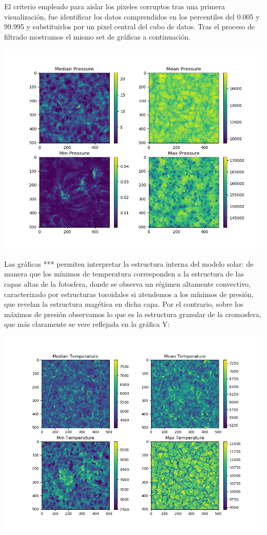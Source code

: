 \documentclass[8pt]{article}
\begin{document}
		
		El criterio empleado para aislar los pixeles corruptos tras una primera visualización, fue identificar los datos comprendidos en los percentiles del 0.005 y 99.995 y substituirlos por un pixel central del cubo de datos. Tras el proceso de filtrado 	mostramos el mismo set de gráficas a continuación.	


		\center \includegraphics[scale=0.5]{Pressure-Z-OK.png}
		
		
		Las gráficas *** permiten interpretar la estructura interna del modelo solar: de manera que los mínimos de temperatura corresponden a la estructura de las capas altas de la fotosfera, donde se observa un régimen altamente convectivo, caracterizado por estructuras toroidales si atendemos a los mínimos de presión, que revelan la estructura magética en dicha capa. Por el contrario, sobre los máximos de presión observamos lo que es la estructura granular de la cromosfera, que más claramente se vere reflejada en la gráfica Y:  
				
		\center \includegraphics[scale=0.5]{Temperature-OK.png}		
				
\end{document}
